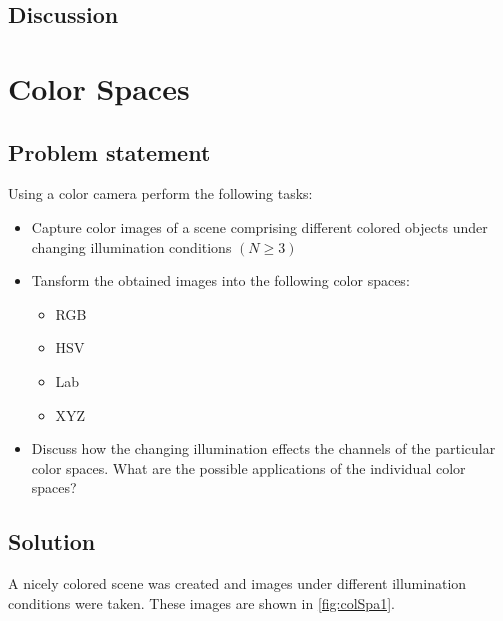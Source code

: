 \documentclass[
a4paper,     %
11pt         %
]{scrartcl}  %
\begin{document}
\subsection{Discussion}

\clearpage
\section{Color Spaces} \label{sec:colSpa}

\subsection{Problem statement}

Using a color camera perform the following tasks:

\begin{itemize}
 \item Capture color images of a scene comprising different colored objects under changing illumination conditions $(N \geq 3)$
 \item Tansform the obtained images into the following color spaces:
 \begin{itemize}
  \item RGB 
  \item HSV
  \item Lab 
  \item XYZ
 \end{itemize}
 \item Discuss how the changing illumination effects the channels of the particular color spaces. What are the possible applications of the individual color spaces?
\end{itemize}

\subsection{Solution}

A nicely colored scene was created and images under different illumination conditions were taken. These images are shown in \cref{fig:colSpa1}.
\end{document}
